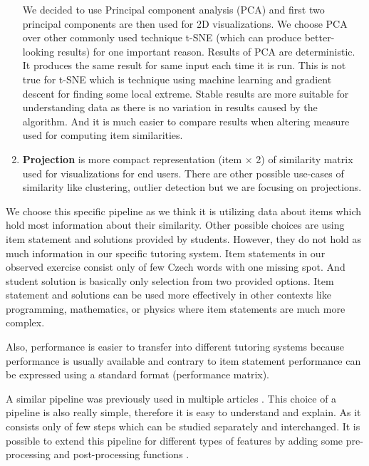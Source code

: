 \documentclass[
  digital, %
  table,   %
  nolof,     %
  nolot,     %
  nocover,
  color,
  final, %
]{fithesis3}
\begin{document}
\begin{enumerate}

    We decided to use Principal component analysis (PCA) and first two principal components are then used for 2D visualizations. We choose PCA over other commonly used technique t-SNE (which can produce better-looking results) for one important reason. Results of PCA are deterministic. It produces the same result for same input each time it is run. This is not true for t-SNE which is technique using machine learning and gradient descent for finding some local extreme. Stable results are more suitable for understanding data as there is no variation in results caused by the algorithm. And it is much easier to compare results when altering measure used for computing item similarities.

  \item
    \textbf{Projection} is more compact representation (item $\times$ 2) of similarity matrix used for visualizations for end users. There are other possible use-cases of similarity like clustering, outlier detection but we are focusing on projections.
\end{enumerate}


We choose this specific pipeline as we think it is utilizing data about items which hold most information about their similarity. Other possible choices are using item statement and solutions provided by students. However, they do not hold as much information in our specific tutoring system. Item statements in our observed exercise consist only of few Czech words with one missing spot. And student solution is basically only selection from two provided options. Item statement and solutions can be used more effectively in other contexts like programming, mathematics, or physics where item statements are much more complex.

Also, performance is easier to transfer into different tutoring systems because performance is usually available and contrary to item statement performance can be expressed using a standard format (performance matrix).

A similar pipeline was previously used in multiple articles \cite{pelanek2018programming, kaser2013cluster}. This choice of a pipeline is also really simple, therefore it is easy to understand and explain. As it consists only of few steps which can be studied separately and interchanged. It is possible to extend this pipeline for different types of features by adding some pre-processing and post-processing functions \cite{kaser2013cluster}.
\end{document}
